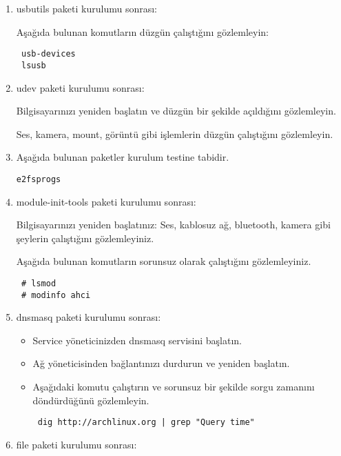 \documentclass[a4paper,10pt]{article}
\begin{document}
\begin{enumerate}
\begin{verbatim}
\end{verbatim}


\item usbutils paketi kurulumu sonrası:

Aşağıda bulunan komutların düzgün çalıştığını gözlemleyin:
\begin{verbatim}
 usb-devices
 lsusb
\end{verbatim}


\item udev paketi kurulumu sonrası:

Bilgisayarınızı yeniden başlatın ve düzgün bir şekilde açıldığını gözlemleyin. 

Ses, kamera, mount, görüntü gibi işlemlerin düzgün çalıştığını gözlemleyin.
\item Aşağıda bulunan paketler kurulum testine tabidir.
\begin{verbatim}
e2fsprogs 
\end{verbatim}
\item module-init-tools paketi kurulumu sonrası:

Bilgisayarınızı yeniden başlatınız:
Ses, kablosuz ağ, bluetooth, kamera gibi şeylerin çalıştığını gözlemleyiniz.

Aşağıda bulunan komutların sorunsuz olarak çalıştığını gözlemleyiniz.
\begin{verbatim}
 # lsmod
 # modinfo ahci
\end{verbatim}


\item dnsmasq paketi kurulumu sonrası:

\begin{itemize}
 \item Service yöneticinizden dnsmasq servisini başlatın.
 \item Ağ yöneticisinden bağlantınızı durdurun ve yeniden başlatın.
 \item Aşağıdaki komutu çalıştırın ve sorunsuz bir şekilde sorgu zamanını döndürdüğünü gözlemleyin.
\begin{verbatim}
 dig http://archlinux.org | grep "Query time"
\end{verbatim}

\end{itemize}


\item file paketi kurulumu sonrası:


\end{enumerate}
\end{document}
